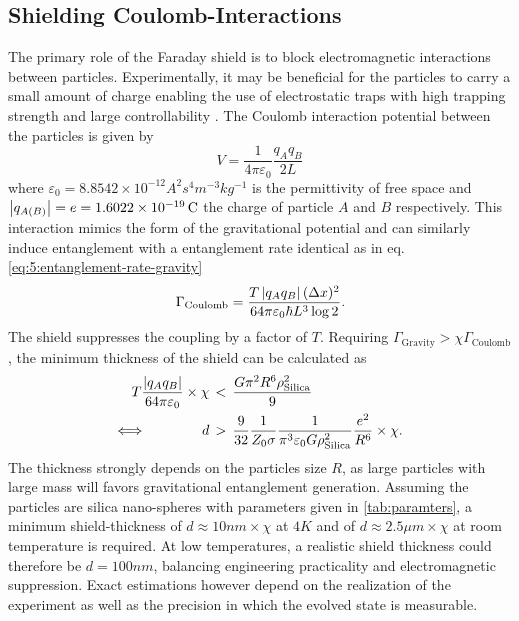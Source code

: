 \subsection{Shielding Coulomb-Interactions}
The primary role of the Faraday shield is to block electromagnetic interactions between particles.
Experimentally, it may be beneficial for the particles to carry a small amount of charge enabling the use of electrostatic traps with high trapping strength and large controllability \cite{GonzalezBallestero_2021}. 
The Coulomb interaction potential between the particles is given by
\begin{equation}
  V = \frac{1}{4\pi\varepsilon_0} \frac{q_A q_B}{2L}
\end{equation}
where $\varepsilon_0 = 8.8542\times 10^{-12}\si{A^2 s^4 m^{-3} kg^{-1}}$ is the permittivity of free space and $\left\lvert q_{A(B)}\right\rvert = e = 1.6022\times 10^{-19}\, \mathrm{C}$ the charge of particle $A$ and $B$ respectively.
This interaction mimics the form of the gravitational potential and can similarly induce entanglement with a entanglement rate identical as in eq. \eqref{eq:5:entanglement-rate-gravity}
\begin{equation}\label{eq:5:entanglement-rate-coulomb}
  \Gamma_\mathrm{Coulomb} = \frac{T \left\lvert q_A q_B\right\rvert (\Delta x)^2}{64 \pi \varepsilon_0 \hbar L^3 \log 2} .
\end{equation}
The shield suppresses the coupling by a factor of $T$.
Requiring $\Gamma_\mathrm{Gravity} > \chi \Gamma_\mathrm{Coulomb}$, the minimum thickness of the shield can be calculated as
\begin{align}\label{eq:5:coulomb-gravity-condition}
  T \frac{\left\lvert q_A q_B\right\rvert}{64 \pi \varepsilon_0} \times \chi \, &< \, \frac{G \pi^2 R^6 \rho_\mathrm{Silica}^2}{9} \\
  \Longleftrightarrow \quad\quad\quad\quad d \, &> \, \frac{9}{32}\frac{1}{Z_0 \sigma} \frac{1}{\pi^3 \varepsilon_0 G \rho_\mathrm{Silica}^2} \frac{e^2}{R^6} \times \chi .
\end{align}
The thickness strongly depends on the particles size $R$, as large particles with large mass will favors gravitational entanglement generation.
Assuming the particles are silica nano-spheres with parameters given in \cref{tab:paramters}, a minimum shield-thickness of $d \approx 10\si{nm}\times\chi$ at $4\si{K}$ and of $d \approx 2.5\si{\mu m}\times\chi$ at room temperature is required.
At low temperatures, a realistic shield thickness could therefore be $d=100\si{nm}$, balancing engineering practicality and electromagnetic suppression.
Exact estimations however depend on the realization of the experiment as well as the precision in which the evolved state is measurable.


